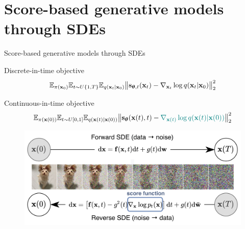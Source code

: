 \section{Score-based generative models through SDEs}
\begin{frame}{Score-based generative models through SDEs}
	\begin{block}{Discrete-in-time objective}
		\vspace{-0.3cm}
		\[
			\mathbb{E}_{\pi(\mathbf{x}_0)} \mathbb{E}_{t \sim U\{1, T\}} \mathbb{E}_{q(\mathbf{x}_t | \mathbf{x}_0)}\bigl\| \mathbf{s}_{\boldsymbol{\theta}, t}(\mathbf{x}_t) - \nabla_{\mathbf{x}_t} \log q(\mathbf{x}_t | \mathbf{x}_0) \bigr\|^2_2 
		\]
		\vspace{-0.3cm}
	\end{block}
	\begin{block}{Continuous-in-time objective}
		\vspace{-0.5cm}
		\[
			\mathbb{E}_{\pi(\mathbf{x}(0))} \mathbb{E}_{t \sim U[0, 1]} \mathbb{E}_{q(\mathbf{x}(t) | \mathbf{x}(0))}\bigl\| \mathbf{s}_{\boldsymbol{\theta}}(\mathbf{x}(t), t) - {\color{teal}\nabla_{\mathbf{x}(t)} \log q(\mathbf{x}(t) | \mathbf{x}(0))} \bigr\|^2_2 
		\]
		\vspace{-0.5cm}
	\end{block}
	\begin{figure}
		\includegraphics[width=0.8\linewidth]{figs/sbgm}
	\end{figure}
\end{frame}
